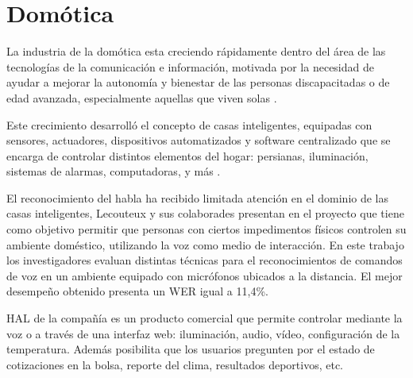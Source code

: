 \section{Dom\'otica}
\label{sec:domotica}

La industria de la dom\'otica esta creciendo r\'apidamente dentro del \'area de las tecnolog\'ias de la
comunicaci\'on e informaci\'on, motivada por la necesidad de ayudar a mejorar la autonom\'ia y bienestar de las personas
discapacitadas o de edad avanzada, especialmente aquellas que viven solas \cite{AlshuVoice2011}.

Este crecimiento desarroll\'o el concepto de casas inteligentes, equipadas con sensores, actuadores, dispositivos
automatizados y software centralizado que se encarga de controlar distintos elementos del hogar: persianas, iluminaci\'on,
sistemas de alarmas, computadoras, y m\'as \cite{LecouteuxSpeech2011, UshaWireless2012}.

El reconocimiento del habla ha recibido limitada atenci\'on en el dominio de las casas inteligentes, Lecouteux y
sus colaborades presentan en \cite{LecouteuxSpeech2011} el proyecto  que tiene como objetivo
permitir que personas con ciertos impedimentos f\'isicos controlen su ambiente dom\'estico, utilizando la voz
como medio de interacci\'on. En este trabajo los investigadores evaluan distintas t\'ecnicas para el reconocimientos
de comandos de voz en un ambiente equipado con micr\'ofonos ubicados a la distancia. El mejor desempe\~no obtenido
presenta un WER igual a 11,4\%.

HAL \cite{HAL} de la compa\~n\'ia  es un producto comercial que permite controlar mediante
la voz o a trav\'es de una interfaz web: iluminaci\'on, audio, v\'ideo, configuraci\'on de la temperatura. Adem\'as
posibilita que los usuarios pregunten por el estado de cotizaciones en la bolsa, reporte del clima, resultados deportivos, etc.
